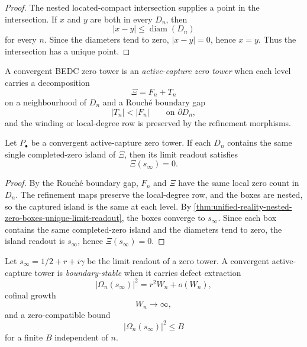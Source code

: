 \begin{proof}
The nested located-compact intersection supplies a point in the
intersection.  If $x$ and $y$ are both in every $D_n$, then
$$
|x-y|\le\operatorname{diam}(D_n)
$$
for every $n$.  Since the diameters tend to zero, $|x-y|=0$, hence
$x=y$.  Thus the intersection has a unique point.
\end{proof}

\begin{definition}
\label{def:unified-reality-active-capture-zero-tower}
A convergent BEDC zero tower is an \emph{active-capture zero tower} when
each level carries a decomposition
$$
\Xi=F_n+T_n
$$
on a neighbourhood of $D_n$ and a Rouch\'e boundary gap
$$
|T_n|<|F_n|
\qquad
\text{on }\partial D_n,
$$
and the winding or local-degree row is preserved by the refinement
morphisms.
\end{definition}

\begin{theorem}
\label{thm:unified-reality-active-capture-convergence-gives-completed-zero}
Let $P_{\bullet}$ be a convergent active-capture zero tower.  If each
$D_n$ contains the same single completed-zero island of $\Xi$, then its
limit readout satisfies
$$
\Xi(s_{\infty})=0.
$$
\end{theorem}

\begin{proof}
By the Rouch\'e boundary gap, $F_n$ and $\Xi$ have the same local zero
count in $D_n$.  The refinement maps preserve the local-degree row, and
the boxes are nested, so the captured island is the same at each level.
By \autoref{thm:unified-reality-nested-zero-boxes-unique-limit-readout},
the boxes converge to $s_{\infty}$.  Since each box contains the same
completed-zero island and the diameters tend to zero, the island readout
is $s_{\infty}$, hence $\Xi(s_{\infty})=0$.
\end{proof}

\begin{definition}
\label{def:unified-reality-boundary-stable-zero-tower}
Let $s_{\infty}=1/2+r+i\gamma$ be the limit readout of a zero tower.  A
convergent active-capture tower is \emph{boundary-stable} when it
carries defect extraction
$$
|\Omega_n(s_{\infty})|^2
=
r^2W_n+o(W_n),
$$
cofinal growth
$$
W_n\to\infty,
$$
and a zero-compatible bound
$$
|\Omega_n(s_{\infty})|^2\le B
$$
for a finite $B$ independent of $n$.
\end{definition}


